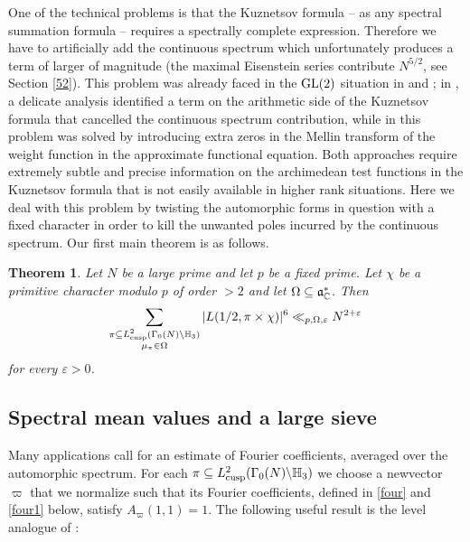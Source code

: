 \documentclass[11pt]{amsart}
\theoremstyle{plain}
\newtheorem{theorem}{Theorem}
\numberwithin{equation}{section}
\theoremstyle{definition}
\begin{document}
One of the technical problems is that the Kuznetsov formula -- as any spectral summation formula -- requires a spectrally complete expression. Therefore we have to artificially add the continuous spectrum which unfortunately produces a term of larger of magnitude (the maximal Eisenstein series contribute $N^{5/2}$, see Section \ref{52}). This problem was already faced in the ${\rm GL}(2)$ situation in 
  \cite{DFI} and \cite{BHM};  in \cite{DFI}, a delicate analysis identified a term on the arithmetic side of the Kuznetsov formula that cancelled the continuous spectrum contribution, while in \cite{BHM} this problem was solved by introducing extra zeros in the Mellin transform of the weight function in the approximate functional equation. Both approaches require extremely subtle and precise information on the  archimedean test functions in the Kuznetsov formula that is not easily available in higher rank situations.  Here we deal with this problem by twisting the automorphic forms in question with a fixed character in order to kill the unwanted poles incurred by the continuous spectrum. Our first main theorem is as follows.

\begin{theorem}\label{main} Let $N$ be a large prime and let $p$ be a fixed prime. Let $\chi$ be a primitive character modulo $p$ of order $> 2$ and let  $\Omega \subseteq \mathfrak{a}_{\Bbb{C}}^{\ast}$.  Then
$$\sum_{\substack{\pi \subseteq L^2_{\rm cusp}(\Gamma_0(N)\backslash \Bbb{H}_3)\\ \mu_{\pi} \in \Omega}} |L(1/2, \pi \times \chi)|^6 \ll_{p, \Omega, \varepsilon} N^{2+\varepsilon}$$
for every $\varepsilon > 0$. 
\end{theorem}
 
 

\subsection{Spectral mean values and a large sieve} Many applications call for an estimate of Fourier coefficients, averaged over the automorphic spectrum.  For each  $\pi \subseteq L_{\text{cusp}}^2(\Gamma_0(N)\backslash \Bbb{H}_3)$ we choose a newvector $\varpi$ that we normalize such that its Fourier coefficients, defined in \eqref{four} and \eqref{four1} below, satisfy $A_{\varpi}(1, 1) = 1$.  %
 The following useful result is the level analogue of %
\cite[Theorem 5]{Bl}:
\end{document}
